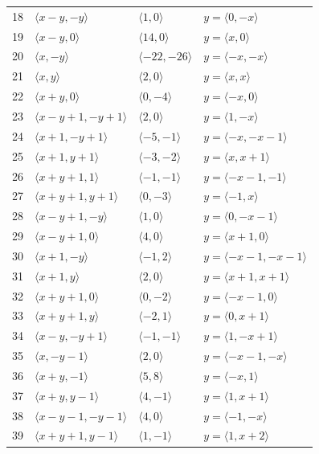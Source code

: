 \documentclass[11pt]{article}
\begin{document}
\begin{longtable}{@{}rlll@{}}
18 & $\langle x-y,-y\rangle$ & $\langle 1,0\rangle$ & $y=\langle 0,-x\rangle$\\
19 & $\langle x-y,0\rangle$ & $\langle 14,0\rangle$ & $y=\langle x,0\rangle$\\
20 & $\langle x,-y\rangle$ & $\langle -22,-26\rangle$ & $y=\langle -x,-x\rangle$\\
21 & $\langle x,y\rangle$ & $\langle 2,0\rangle$ & $y=\langle x,x\rangle$\\
22 & $\langle x+y,0\rangle$ & $\langle 0,-4\rangle$ & $y=\langle -x,0\rangle$\\
23 & $\langle x-y+1,-y+1\rangle$ & $\langle 2,0\rangle$ & $y=\langle 1,-x\rangle$\\
24 & $\langle x+1,-y+1\rangle$ & $\langle -5,-1\rangle$ & $y=\langle -x,-x-1\rangle$\\
25 & $\langle x+1,y+1\rangle$ & $\langle -3,-2\rangle$ & $y=\langle x,x+1\rangle$\\
26 & $\langle x+y+1,1\rangle$ & $\langle -1,-1\rangle$ & $y=\langle -x-1,-1\rangle$\\
27 & $\langle x+y+1,y+1\rangle$ & $\langle 0,-3\rangle$ & $y=\langle -1,x\rangle$\\
28 & $\langle x-y+1,-y\rangle$ & $\langle 1,0\rangle$ & $y=\langle 0,-x-1\rangle$\\
29 & $\langle x-y+1,0\rangle$ & $\langle 4,0\rangle$ & $y=\langle x+1,0\rangle$\\
30 & $\langle x+1,-y\rangle$ & $\langle -1,2\rangle$ & $y=\langle -x-1,-x-1\rangle$\\
31 & $\langle x+1,y\rangle$ & $\langle 2,0\rangle$ & $y=\langle x+1,x+1\rangle$\\
32 & $\langle x+y+1,0\rangle$ & $\langle 0,-2\rangle$ & $y=\langle -x-1,0\rangle$\\
33 & $\langle x+y+1,y\rangle$ & $\langle -2,1\rangle$ & $y=\langle 0,x+1\rangle$\\
34 & $\langle x-y,-y+1\rangle$ & $\langle -1,-1\rangle$ & $y=\langle 1,-x+1\rangle$\\
35 & $\langle x,-y-1\rangle$ & $\langle 2,0\rangle$ & $y=\langle -x-1,-x\rangle$\\
36 & $\langle x+y,-1\rangle$ & $\langle 5,8\rangle$ & $y=\langle -x,1\rangle$\\
37 & $\langle x+y,y-1\rangle$ & $\langle 4,-1\rangle$ & $y=\langle 1,x+1\rangle$\\
38 & $\langle x-y-1,-y-1\rangle$ & $\langle 4,0\rangle$ & $y=\langle -1,-x\rangle$\\
39 & $\langle x+y+1,y-1\rangle$ & $\langle 1,-1\rangle$ & $y=\langle 1,x+2\rangle$\\

\end{longtable}
\end{document}
